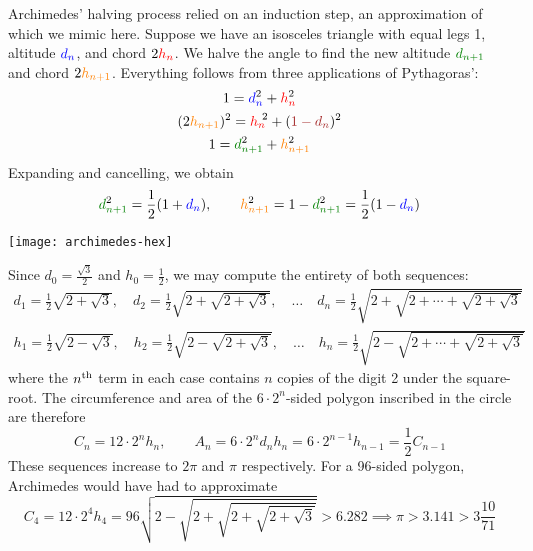 \begin{minipage}[t]{0.64\linewidth}\vspace{-5pt}
	Archimedes' halving process relied on an induction step, an approximation of which we mimic here. Suppose we have an isosceles triangle with equal legs 1, altitude $\textcolor{blue}{d_n}$, and chord $2\textcolor{red}{h_n}$. We halve the angle to find the new altitude $\textcolor{Green}{d_{n+1}}$ and chord $2\textcolor{orange}{h_{n+1}}$. Everything follows from three applications of Pythagoras':
	\begin{gather*}
		1=\textcolor{blue}{d}^2_{\textcolor{blue}{n}} +\textcolor{red}{h}^2_{\textcolor{red}{n}}\\
		(2\textcolor{orange}{h_{n+1}})^2=\textcolor{red}{h_n}\!\!\!\!\!{\phantom{h}}^2 +(\textcolor{Brown}{1-d_n})^2\\ 
		1=\textcolor{Green}{d}^2_{\textcolor{Green}{n+1}} +\textcolor{orange}{h}^2_{\textcolor{orange}{n+1}}
	\end{gather*}
	Expanding and cancelling, we obtain
	\[
		\textcolor{Green}{d}^2_{\textcolor{Green}{n+1}} =\frac 12(1+\textcolor{blue}{d}_{\textcolor{blue}{n}}),\qquad \textcolor{orange}{h}^2_{\textcolor{orange}{n+1}} =1-\textcolor{Green}{d}^2_{\textcolor{Green}{n+1}} =\frac 12(1-\textcolor{blue}{d}_{\textcolor{blue}{n}})
	\]
\end{minipage}
\hfill
\begin{minipage}[t]{0.35\linewidth}\vspace{0pt}
	\flushright
	\texttt{[image: archimedes-hex]}
\end{minipage}
\medbreak
Since $d_0=\frac{\sqrt 3}2$ and $h_0=\frac 12$, we may compute the entirety of both sequences:
\begin{gather*}
	d_1=\frac 12\sqrt{2+\sqrt 3},\quad d_2=\frac 12\sqrt{2+\sqrt{2+\sqrt 3}},\quad\ldots\quad d_n=\frac 12\sqrt{2+\sqrt{2+\cdots+\sqrt{2+\sqrt 3}}}\\
	h_1=\frac 12\sqrt{2-\sqrt 3},\quad h_2=\frac 12\sqrt{2-\sqrt{2+\sqrt 3}},\quad\ldots\quad h_n=\frac 12\sqrt{2-\sqrt{2+\cdots+\sqrt{2+\sqrt 3}}}
\end{gather*}
where the $n\textsuperscript{th}$ term in each case contains $n$ copies of the digit 2 under the square-root. The circumference and area of the $6\cdot 2^n$-sided polygon inscribed in the circle are therefore
\[
	C_n=12\cdot 2^nh_n,\qquad A_n=6\cdot 2^nd_nh_n=6\cdot 2^{n-1}h_{n-1}=\frac 12C_{n-1}
\]
These sequences increase to $2\pi$ and $\pi$ respectively. For a 96-sided polygon, Archimedes would have had to approximate
\[
	C_4=12\cdot 2^4h_4=96\sqrt{2-\sqrt{2+\sqrt{2+\sqrt{2+\sqrt 3}}}}> 6.282\implies \pi>3.141>3\frac{10}{71}
\]




